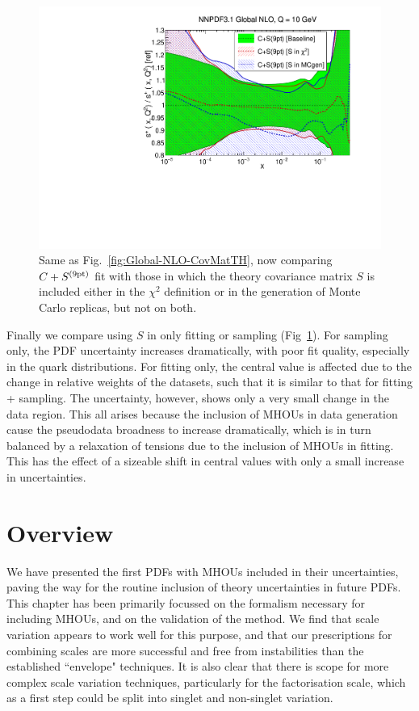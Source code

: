 \begin{figure}[h]
\begin{center}
   \includegraphics[scale=0.35]{mhous/plots/xsp-Global-NLO-CovMatTH-tests.pdf}
   \caption{\small Same as Fig.~\ref{fig:Global-NLO-CovMatTH}, now comparing $C+S^{(\rm 9pt)}$ fit with those in which
     the theory covariance matrix $S$ is included either in the $\chi^2$
     definition or in the generation of Monte Carlo replicas, but not on both.
    \label{fig:Global-NLO-CovMatTH-tests} }
  \end{center}
\end{figure}
Finally we compare using $S$ in only fitting or sampling (Fig~\ref{fig:Global-NLO-CovMatTH-tests}). For sampling only, the PDF uncertainty increases dramatically, with poor fit quality, especially in the quark distributions. For fitting only, the central value is affected due to the change in relative weights of the datasets, such that it is similar to that for fitting + sampling. The uncertainty, however, shows only a very small change in the data region. This all arises because the inclusion of MHOUs in data generation cause the pseudodata broadness to increase dramatically, which is in turn balanced by a relaxation of tensions due to the inclusion of MHOUs in fitting. This has the effect of a sizeable shift in central values with only a small increase in uncertainties. 

\section{Overview}
\label{sec:overview}
We have presented the first PDFs with MHOUs included in their uncertainties, paving the way for the routine inclusion of theory uncertainties in future PDFs. This chapter has been primarily focussed on the formalism necessary for including MHOUs, and on the validation of the method. We find that scale variation appears to work well for this purpose, and that our prescriptions for combining scales are more successful and free from instabilities than the established ``envelope" techniques. It is also clear that there is scope for more complex scale variation techniques, particularly for the factorisation scale, which as a first step could be split into singlet and non-singlet variation. 

